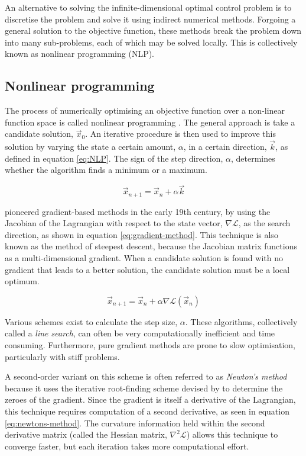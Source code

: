An alternative to solving the infinite-dimensional optimal control problem is to discretise the problem and solve it using indirect numerical methods. Forgoing a general solution to the objective function, these methods break the problem down into many sub-problems, each of which may be solved locally. This is collectively known as nonlinear programming (NLP).

\subsection{Nonlinear programming}

The process of numerically optimising an objective function over a non-linear function space is called nonlinear programming \parencite{Betts1998}. The general approach is take a candidate solution, $\vec{x}_0$. An iterative procedure is then used to improve this solution by varying the state a certain amount, $\alpha$, in a certain direction, $\vec{k}$, as defined in equation \eqref{eq:NLP}. The sign of the step direction, $\alpha$, determines whether the algorithm finds a minimum or a maximum.

\begin{equation} \label{eq:NLP}
\vec{x}_{n+1}=\vec{x}_n+\alpha\vec{k}
\end{equation}

\textcite{Gauss1827} pioneered gradient-based methods in the early 19th century, by using the Jacobian of the Lagrangian with respect to the state vector, $\nabla\mathcal{L}$, as the search direction, as shown in equation \eqref{eq:gradient-method}. This technique is also known as the method of steepest descent, because the Jacobian matrix functions as a multi-dimensional gradient. When a candidate solution is found with no gradient that leads to a better solution, the candidate solution must be a local optimum.

\begin{equation} \label{eq:gradient-method}
\vec{x}_{n+1}=\vec{x}_n + \alpha\nabla\mathcal{L}(\vec{x}_n)
\end{equation}

Various schemes exist to calculate the step size, $\alpha$. These algorithms, collectively called a \emph{line search}, can often be very computationally inefficient and time consuming. Furthermore, pure gradient methods are prone to slow optimisation, particularly with stiff problems. %

A second-order variant on this scheme is often referred to as \emph{Newton's method} because it uses the iterative root-finding scheme devised by \textcite{Newton1711, Newton1736} to determine the zeroes of the gradient. Since the gradient is itself a derivative of the Lagrangian, this technique requires computation of a second derivative, as seen in equation \eqref{eq:newtons-method}. The curvature information held within the second derivative matrix (called the Hessian matrix, $\nabla^2\mathcal{L}$) allows this technique to converge faster, but each iteration takes more computational effort.

